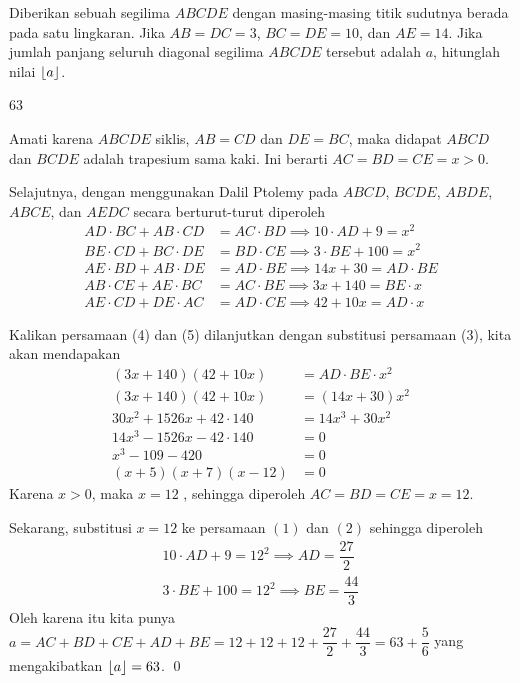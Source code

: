 \documentclass[12pt]{scrartcl}
\begin{document}
	\begin{soalbaru}
		Diberikan sebuah segilima $ABCDE$ dengan masing-masing titik sudutnya berada pada satu lingkaran. Jika $AB=DC=3$, $BC=DE=10$, dan $AE=14$. Jika jumlah panjang seluruh diagonal segilima $ABCDE$ tersebut adalah $a$, hitunglah nilai $\left\lfloor a \right\rfloor$.
		\begin{jawaban}
		63
		\end{jawaban}
		\begin{solusi}
		Amati karena $ABCDE$ siklis, $AB=CD$ dan $DE=BC$, maka didapat $ABCD$ dan $BCDE$ adalah trapesium sama kaki. Ini berarti $AC=BD=CE=x > 0$.
		
		Selajutnya, dengan menggunakan Dalil Ptolemy pada $ABCD$, $BCDE$, $ABDE$, $ABCE$, dan $AEDC$ secara berturut-turut diperoleh 
		\begin{align}
		AD \cdot BC + AB \cdot CD &= AC \cdot BD \implies 10\cdot AD+9 = x^2\\
		BE \cdot CD + BC \cdot DE &= BD \cdot CE \implies 3 \cdot BE + 100 = x^2\\
		AE \cdot BD + AB \cdot DE &= AD \cdot BE \implies 14x+30 = AD \cdot BE\\
		AB \cdot CE + AE \cdot BC &= AC \cdot BE \implies 3x+140 = BE \cdot x\\
		AE \cdot CD + DE \cdot AC &= AD \cdot CE \implies 42+10x=AD \cdot x
		\end{align}
		
		Kalikan persamaan (4) dan (5) dilanjutkan dengan substitusi persamaan (3), kita akan mendapakan 
		\begin{align*}
		(3x+140)(42+10x) &= AD \cdot BE \cdot x^2\\
		(3x+140)(42+10x) &= (14x+30)x^2\\
		30x^2+1526x+42\cdot140 &= 14x^3+30x^2\\
		14x^3-1526x-42\cdot 140 &= 0\\
		x^3-109-420 &= 0\\
		(x+5)(x+7)(x-12) &= 0
		\end{align*}
		 Karena $x>0$, maka $x=12$ , sehingga diperoleh $AC = BD = CE = x =12$.
		 
		 Sekarang, substitusi $x=12$ ke persamaan $(1)$ dan $(2)$ sehingga diperoleh 
		 \begin{align*}
		 10\cdot AD + 9 = 12^2 \implies AD = \dfrac{27}{2}\\
		 3\cdot BE + 100 = 12^2 \implies BE = \dfrac{44}{3}
		 \end{align*}
		 Oleh karena itu kita punya $a = AC +BD +CE +AD +BE = 12+12+12+\dfrac{27}{2}+\dfrac{44}{3}=63+\dfrac{5}{6}$ yang mengakibatkan $\left\lfloor a \right\rfloor=63$. \qed
		
		\end{solusi}
	\end{soalbaru}
	
\end{document}

